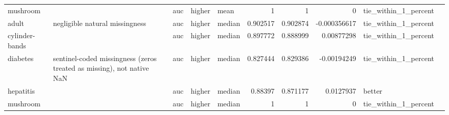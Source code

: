 \begin{table}[ht]
{\begin{tabular}{lllllrrrll}
 mushroom       &                                                                       & auc                            & higher             & mean             &                   1        &               1        &                     0           & tie\_within\_1\_percent &                                                                                                                    \\
 adult          & negligible natural missingness                                        & auc                            & higher             & median           &                   0.902517 &               0.902874 &                    -0.000356617 & tie\_within\_1\_percent &                                                                                                                    \\
 cylinder-bands &                                                                       & auc                            & higher             & median           &                   0.897772 &               0.888999 &                     0.00877298  & tie\_within\_1\_percent &                                                                                                                    \\
 diabetes       & sentinel-coded missingness (zeros treated as missing), not native NaN & auc                            & higher             & median           &                   0.827444 &               0.829386 &                    -0.00194249  & tie\_within\_1\_percent &                                                                                                                    \\
 hepatitis      &                                                                       & auc                            & higher             & median           &                   0.88397  &               0.871177 &                     0.0127937   & better               &                                                                                                                    \\
 mushroom       &                                                                       & auc                            & higher             & median           &                   1        &               1        &                     0           & tie\_within\_1\_percent &                                                                                                                    \\

\end{tabular}}
\end{table}
